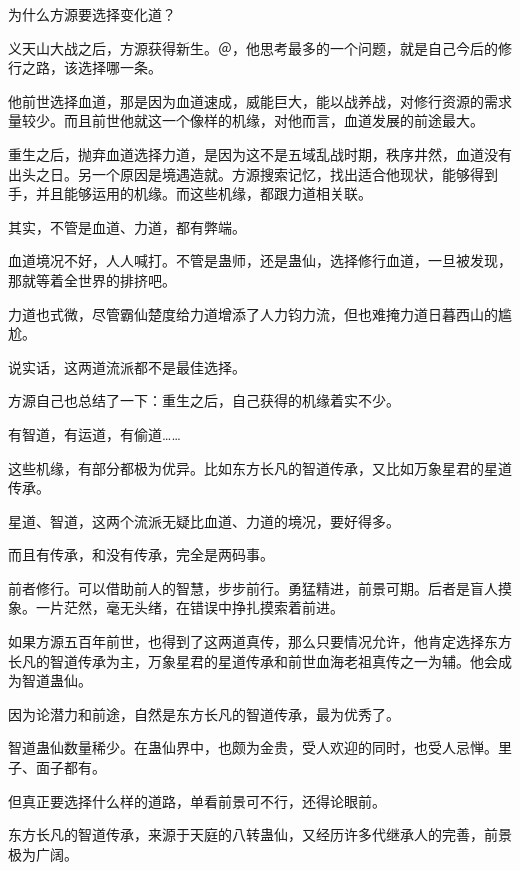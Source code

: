 
\begin{this_body}



为什么方源要选择变化道？

义天山大战之后，方源获得新生。＠，他思考最多的一个问题，就是自己今后的修行之路，该选择哪一条。

他前世选择血道，那是因为血道速成，威能巨大，能以战养战，对修行资源的需求量较少。而且前世他就这一个像样的机缘，对他而言，血道发展的前途最大。

重生之后，抛弃血道选择力道，是因为这不是五域乱战时期，秩序井然，血道没有出头之日。另一个原因是境遇造就。方源搜索记忆，找出适合他现状，能够得到手，并且能够运用的机缘。而这些机缘，都跟力道相关联。

其实，不管是血道、力道，都有弊端。

血道境况不好，人人喊打。不管是蛊师，还是蛊仙，选择修行血道，一旦被发现，那就等着全世界的排挤吧。

力道也式微，尽管霸仙楚度给力道增添了人力钧力流，但也难掩力道日暮西山的尴尬。

说实话，这两道流派都不是最佳选择。

方源自己也总结了一下：重生之后，自己获得的机缘着实不少。

有智道，有运道，有偷道……

这些机缘，有部分都极为优异。比如东方长凡的智道传承，又比如万象星君的星道传承。

星道、智道，这两个流派无疑比血道、力道的境况，要好得多。

而且有传承，和没有传承，完全是两码事。

前者修行。可以借助前人的智慧，步步前行。勇猛精进，前景可期。后者是盲人摸象。一片茫然，毫无头绪，在错误中挣扎摸索着前进。

如果方源五百年前世，也得到了这两道真传，那么只要情况允许，他肯定选择东方长凡的智道传承为主，万象星君的星道传承和前世血海老祖真传之一为辅。他会成为智道蛊仙。

因为论潜力和前途，自然是东方长凡的智道传承，最为优秀了。

智道蛊仙数量稀少。在蛊仙界中，也颇为金贵，受人欢迎的同时，也受人忌惮。里子、面子都有。

但真正要选择什么样的道路，单看前景可不行，还得论眼前。

东方长凡的智道传承，来源于天庭的八转蛊仙，又经历许多代继承人的完善，前景极为广阔。


\end{this_body}
